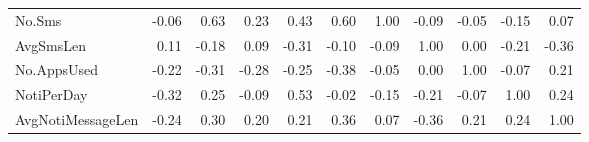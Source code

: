 \begin{landscape}
\begin{table}[]
{\begin{tabular}{@{}l|rrrrrrrrrr@{}}
\multicolumn{1}{|l|}{No.Sms}            & \cellcolor[HTML]{4FD22F}-0.06 & 0.63                          & 0.23                             & 0.43                              & 0.60                           & 1.00                          & -0.09                          & -0.05                            & -0.15                           & 0.07                                   \\ \cmidrule(r){1-1}
\multicolumn{1}{|l|}{AvgSmsLen}         & \cellcolor[HTML]{4FD22F}0.11  & -0.18                         & 0.09                             & -0.31                             & -0.10                          & -0.09                         & 1.00                           & 0.00                             & -0.21                           & -0.36                                  \\ \cmidrule(r){1-1}
\multicolumn{1}{|l|}{No.AppsUsed}       & \cellcolor[HTML]{4FD22F}-0.22 & -0.31                         & -0.28                            & -0.25                             & -0.38                          & -0.05                         & 0.00                           & 1.00                             & -0.07                           & 0.21                                   \\ \cmidrule(r){1-1}
\multicolumn{1}{|l|}{NotiPerDay}        & \cellcolor[HTML]{4FD22F}-0.32 & 0.25                          & -0.09                            & 0.53                              & -0.02                          & -0.15                         & -0.21                          & -0.07                            & 1.00                            & 0.24                                   \\ \cmidrule(r){1-1}
\multicolumn{1}{|l|}{AvgNotiMessageLen} & \cellcolor[HTML]{4FD22F}-0.24 & 0.30                          & 0.20                             & 0.21                              & 0.36                           & 0.07                          & -0.36                          & 0.21                             & 0.24                            & 1.00                                   \\ \bottomrule
\end{tabular}%
}
\end{table}


\end{landscape}

